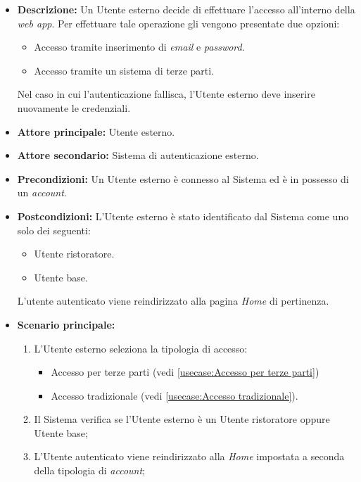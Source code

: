 \label{usecase:Effettua accesso}

\begin{itemize}
	\item \textbf{Descrizione:} Un Utente esterno decide di effettuare l'accesso all'interno della \textit{web app}. Per effettuare tale
	operazione gli vengono presentate due opzioni:
	\begin{itemize}
		\item Accesso tramite inserimento di \textit{email} e \textit{password}.
		\item Accesso tramite un sistema di terze parti.
	\end{itemize}
	Nel caso in cui l'autenticazione fallisca, l'Utente esterno deve inserire nuovamente le credenziali.

	\item \textbf{Attore principale:} Utente esterno.
	\item \textbf{Attore secondario:} Sistema di autenticazione esterno.
	\item \textbf{Precondizioni:}
	      Un Utente esterno è connesso al Sistema ed è in possesso di un \textit{account}.
	\item \textbf{Postcondizioni:}
	      L'Utente esterno è stato identificato dal Sistema come uno solo dei seguenti:
	      \begin{itemize}
		      \item Utente ristoratore.
		      \item Utente base.
	      \end{itemize}
		  L'utente autenticato viene reindirizzato alla pagina \textit{Home} di pertinenza.

	\item \textbf{Scenario principale:}
	      \begin{enumerate}
		      \item L'Utente esterno seleziona la tipologia di accesso: 

			  \begin{itemize}
				\item Accesso per terze parti (vedi \autoref{usecase:Accesso per terze parti})
				\item Accesso tradizionale (vedi \autoref{usecase:Accesso tradizionale}).
			  \end{itemize}

		      \item Il Sistema verifica se l'Utente esterno è un Utente ristoratore oppure Utente base;
		      \item L'Utente autenticato viene reindirizzato alla \textit{Home} impostata a seconda della tipologia di \textit{account};		
	      \end{enumerate}
		

\end{itemize}
